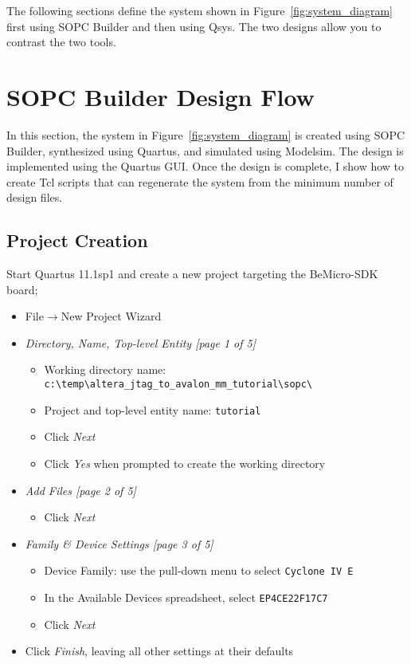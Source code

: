 \documentclass[10pt,twoside]{article}
\begin{document}
The following sections define the system shown in 
Figure~\ref{fig:system_diagram} first using SOPC Builder
and then using Qsys. The two designs allow you to contrast
the two tools.

\clearpage
\section{SOPC Builder Design Flow}

In this section, the system in Figure~\ref{fig:system_diagram}
is created using SOPC Builder, synthesized using Quartus, and
simulated using Modelsim. The design is implemented using
the Quartus GUI. Once the design is complete, I show how to
create Tcl scripts that can regenerate the system from the
minimum number of design files.

\subsection{Project Creation}

Start Quartus 11.1sp1 and create a new project targeting the BeMicro-SDK board;
\begin{itemize}
\item File$\rightarrow$New Project Wizard
\item {\em Directory, Name, Top-level Entity [page 1 of 5]}
\begin{itemize}
\item Working directory name: \verb+c:\temp\altera_jtag_to_avalon_mm_tutorial\sopc\+
\item Project and top-level entity name: \verb+tutorial+
\item Click {\em Next}
\item Click {\em Yes} when prompted to create the working directory
\end{itemize}
%
\item {\em Add Files [page 2 of 5]}
\begin{itemize}
\item Click {\em Next}
\end{itemize}
%
\item {\em Family \& Device Settings [page 3 of 5]}
\begin{itemize}
\item Device Family: use the pull-down menu to select \verb+Cyclone IV E+
\item In the Available Devices spreadsheet, select \verb+EP4CE22F17C7+
\item Click {\em Next}
\end{itemize}
%
\item Click {\em Finish}, leaving all other settings at their defaults
\end{itemize}
\end{document}
